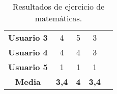 \begin{table}[H]
{\begin{tabular}{c|ccc|l}
            \multicolumn{1}{|c|}{\textbf{Usuario 3}} & \multicolumn{1}{c|}{4}                                                                                                                                          & \multicolumn{1}{c|}{5}                                                                                                                                                                 & 3                                                                                                                                                                                                        & \\ \cline{1-4}
            \multicolumn{1}{|c|}{\textbf{Usuario 4}} & \multicolumn{1}{c|}{4}                                                                                                                                          & \multicolumn{1}{c|}{4}                                                                                                                                                                 & 3                                                                                                                                                                                                        & \\ \cline{1-4}
            \multicolumn{1}{|c|}{\textbf{Usuario 5}} & \multicolumn{1}{c|}{1}                                                                                                                                          & \multicolumn{1}{c|}{1}                                                                                                                                                                 & 1                                                                                                                                                                                                        & \\ \cline{1-4}
            \multicolumn{1}{|c|}{\textbf{Media}}     & \multicolumn{1}{c|}{\textbf{3,4}}                                                                                                                               & \multicolumn{1}{c|}{\textbf{4}}                                                                                                                                                        & \textbf{3,4}                                                                                                                                                                                             & \\ \cline{1-4}
        \end{tabular}%
    }
    \caption{Resultados de ejercicio de matemáticas.}
    \label{tab:resultadosMatematicas}
\end{table}


